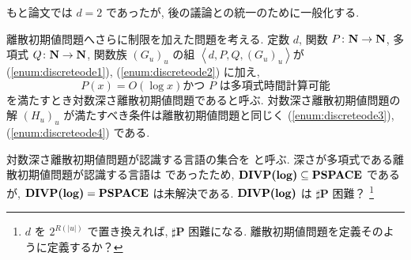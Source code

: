  もと論文では $d = 2$ であったが, 後の議論との統一のために一般化する.



  離散初期値問題へさらに制限を加えた問題を考える.
  定数 $d$, 関数 $P \colon \mathbf N \to \mathbf N$, 多項式 $Q \colon \mathbf N \to \mathbf N$, 
  関数族 $(G_u)_u$ の組 $\left< d, P, Q, (G_u)_u \right>$が
  (\ref{enum:discreteode1}), (\ref{enum:discreteode2}) に加え,
  \begin{equation}
   P(x) = O(\log x) \text{かつ $P$ は多項式時間計算可能}
  \end{equation}
  を満たすとき対数深さ離散初期値問題であると呼ぶ.
  対数深さ離散初期値問題の解 $(H_u)_u$ が満たすべき条件は離散初期値問題と同じく
  (\ref{enum:discreteode3}), (\ref{enum:discreteode4}) である.

  対数深さ離散初期値問題が認識する言語の集合を \DIVPlog と呼ぶ.
  深さが多項式である離散初期値問題が認識する言語は \PSPACE であったため,
  $\text{\bf DIVP(log)} \subseteq {\bf PSPACE}$ であるが, $\text{\bf DIVP(log)} = {\bf PSPACE}$ は未解決である.
  $\text{\bf DIVP(log)}$ は $\sharp${\bf P} 困難？    
  \footnote{$d$ を $2^{R(|u|)}$ で置き換えれば, $\sharp${\bf P} 困難になる.
  離散初期値問題を定義そのように定義するか？}
